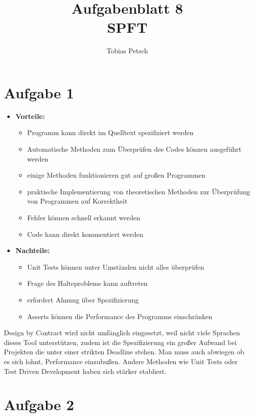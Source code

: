 \documentclass[a4paper,12pt]{article}
\title{Aufgabenblatt 8\\\large SPFT}
\author{Tobias Petsch}
\date{}
\begin{document}
\maketitle

\section*{Aufgabe 1}

\begin{itemize}
    \item \textbf{Vorteile:}
    \begin{itemize}
        \item Programm kann direkt im Quelltext spezifiziert werden
        \item Automatische Methoden zum Überprüfen des Codes können ausgeführt werden
        \item einige Methoden funktionieren gut auf großen Programmen
        \item praktische Implementierung von theoretischen Methoden zur Überprüfung von Programmen auf Korrektheit
        \item Fehler können schnell erkannt werden
        \item Code kann direkt kommentiert werden
    \end{itemize}
    \item \textbf{Nachteile:}
    \begin{itemize}
        \item Unit Tests können unter Umständen nicht alles überprüfen
        \item Frage des Halteproblems kann auftreten
        \item erfordert Ahnung über Spezifizierung
        \item Asserts können die Performance des Programms einschränken
    \end{itemize}
\end{itemize}

Design by Contract wird nicht umfänglich eingesetzt, weil nicht viele Sprachen dieses Tool unterstützen, zudem ist die Spezifizierung ein großer Aufwand bei Projekten
die unter einer strikten Deadline stehen. Man muss auch abwiegen ob es sich lohnt, Performance einzubußen. Andere Methoden wie Unit Tests oder Test Driven Development 
haben sich stärker etabliert.

\section*{Aufgabe 2}
\end{document}
